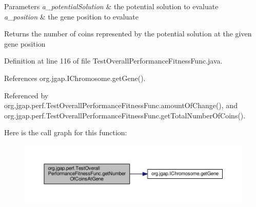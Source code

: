 \begin{DoxyParams}{Parameters}
{\em a\-\_\-potential\-Solution} & the potential solution to evaluate \\
\hline
{\em a\-\_\-position} & the gene position to evaluate \\
\hline
\end{DoxyParams}
\begin{DoxyReturn}{Returns}
the number of coins represented by the potential solution at the given gene position 
\end{DoxyReturn}


Definition at line 116 of file Test\-Overall\-Performance\-Fitness\-Func.\-java.



References org.\-jgap.\-I\-Chromosome.\-get\-Gene().



Referenced by org.\-jgap.\-perf.\-Test\-Overall\-Performance\-Fitness\-Func.\-amount\-Of\-Change(), and org.\-jgap.\-perf.\-Test\-Overall\-Performance\-Fitness\-Func.\-get\-Total\-Number\-Of\-Coins().



Here is the call graph for this function\-:
\nopagebreak
\begin{figure}[H]
\begin{center}
\leavevmode
\includegraphics[width=350pt]{classorg_1_1jgap_1_1perf_1_1_test_overall_performance_fitness_func_a5a0912da774ae3f4e5d8435477234e5a_cgraph}
\end{center}
\end{figure}


